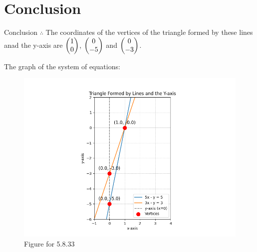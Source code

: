 \documentclass{beamer}
\theoremstyle{remark}
\begin{document}
\section{Conclusion}
\begin{frame}{Conclusion}
$\therefore$ The coordinates of the vertices of the triangle formed by these lines anad the y-axis are $\begin{pmatrix}1\\0\end{pmatrix}$, $\begin{pmatrix}0\\-5\end{pmatrix}$ and $\begin{pmatrix}0\\-3\end{pmatrix}$.

The graph of the system of equations:\\

\begin{figure}[H]
    \centering
    \includegraphics[width=0.60\columnwidth]{figs/1.png}
    \caption{Figure for 5.8.33}
\end{figure}
\end{frame}
\end{document}
